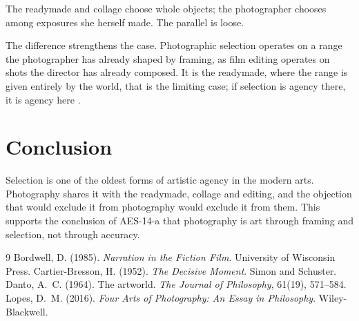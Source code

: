\documentclass{situationist-preprint}
\begin{document}
\begin{objection}
The readymade and collage choose whole objects; the photographer chooses among exposures she herself made. The parallel is loose.
\end{objection}

\begin{reply}
The difference strengthens the case. Photographic selection operates on a range the photographer has already shaped by framing, as film editing operates on shots the director has already composed. It is the readymade, where the range is given entirely by the world, that is the limiting case; if selection is agency there, it is agency here \citep{Lopes2016}.
\end{reply}

\section{Conclusion}

Selection is one of the oldest forms of artistic agency in the modern arts. Photography shares it with the readymade, collage and editing, and the objection that would exclude it from photography would exclude it from them. This supports the conclusion of AES-14-a that photography is art through framing and selection, not through accuracy.

\begin{thebibliography}{9}\small
{} Bordwell, D. (1985). \emph{Narration in the Fiction Film}. University of Wisconsin Press.
 Cartier-Bresson, H. (1952). \emph{The Decisive Moment}. Simon and Schuster.
 Danto, A.~C. (1964). The artworld. \emph{The Journal of Philosophy}, 61(19), 571--584.
 Lopes, D.~M. (2016). \emph{Four Arts of Photography: An Essay in Philosophy}. Wiley-Blackwell.
\end{thebibliography}
\end{document}

